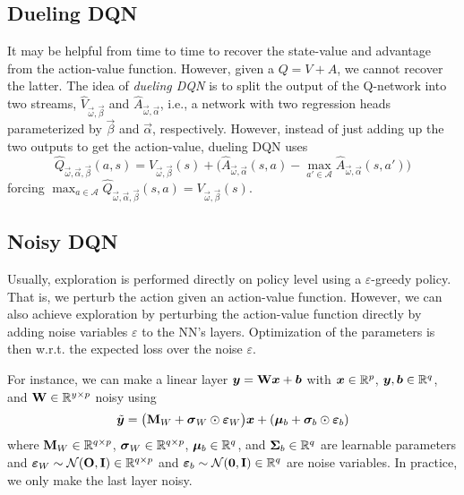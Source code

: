 		\subsection{Dueling \acs{DQN}}
			It may be helpful from time to time to recover the state-value and advantage from the action-value function. However, given a \(Q = V + A\), we cannot recover the latter. The idea of \emph{dueling \ac{DQN}} is to split the output of the Q-network into two streams, \(\hat{V}_{\vec{\omega}, \vec{\beta}}\) and \(\hat{A}_{\vec{\omega}, \vec{\alpha}}\), i.e., a network with two regression heads parameterized by \(\vec{\beta}\) and \(\vec{\alpha}\), respectively. However, instead of just adding up the two outputs to get the action-value, dueling \ac{DQN} uses
			\begin{equation}
				\hat{Q}_{\vec{\omega}, \vec{\alpha}, \vec{\beta}}(a, s) = V_{\vec{\omega}, \vec{\beta}}(s) + \bigl( \hat{A}_{\vec{\omega}, \vec{\alpha}}(s, a) - \max_{a' \in \mathcal{A}} \hat{A}_{\vec{\omega}, \vec{\alpha}}(s, a') \bigr)
			\end{equation}
			forcing \( \max_{a \in \mathcal{A}} \hat{Q}_{\vec{\omega}, \vec{\alpha}, \vec{\beta}}(s, a) = V_{\vec{\omega}, \vec{\beta}}(s) \).

		\subsection{Noisy \acs{DQN}}
			Usually, exploration is performed directly on policy level using a \(\varepsilon\)-greedy policy. That is, we perturb the action given an action-value function. However, we can also achieve exploration by perturbing the action-value function directly by adding noise variables \(\varepsilon\) to the \ac{NN}'s layers. Optimization of the parameters is then w.r.t. the expected loss over the noise \(\varepsilon\).

			For instance, we can make a linear layer \( \bm{y} = \bm{\mathrm{W}} \bm{x} + \bm{b} \) with \( \bm{x} \in \mathbb{R}^p \), \( \bm{y}, \bm{b} \in \mathbb{R}^q \), and \( \bm{\mathrm{W}} \in \mathbb{R}^{y \times p} \) noisy using
			\begin{equation}
				\tilde{\bm{y}} = \bigl( \bm{\mathrm{M}}_W + \bm{\mathrm{\sigma}}_W \odot \bm{\mathrm{\varepsilon}}_W \bigr) \bm{x} + (\bm{\mu}_b + \bm{\sigma}_b \odot \bm{\varepsilon}_b)
			\end{equation}
			where \( \bm{\mathrm{M}}_W \in \mathbb{R}^{q \times p} \), \( \bm{\mathrm{\sigma}}_W \in \mathbb{R}^{q \times p} \), \( \bm{\mu}_b \in \mathbb{R}^q \), and \( \bm{\mathrm{\Sigma}}_b \in \mathbb{R}^q \) are learnable parameters and \( \bm{\mathrm{\varepsilon}}_W \sim \mathcal{N}(\bm{\mathrm{O}}, \bm{\mathrm{I}}) \in \mathbb{R}^{q \times p} \) and \( \bm{\varepsilon}_b \sim \mathcal{N}(\bm{0}, \bm{\mathrm{I}}) \in \mathbb{R}^q \) are noise variables. In practice, we only make the last layer noisy.

